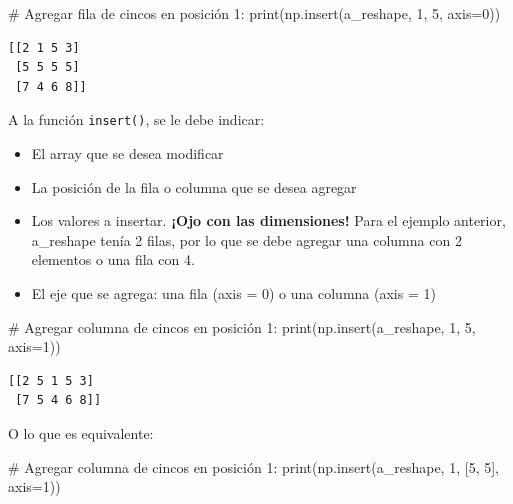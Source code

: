 \documentclass[
  letterpaper,
  DIV=11,
  numbers=noendperiod]{scrreprt}
\newenvironment{Shaded}{\begin{snugshade}}{\end{snugshade}}
\newcommand{\BuiltInTok}[1]{\textcolor[rgb]{0.00,0.23,0.31}{#1}}
\newcommand{\CommentTok}[1]{\textcolor[rgb]{0.37,0.37,0.37}{#1}}
\newcommand{\DecValTok}[1]{\textcolor[rgb]{0.68,0.00,0.00}{#1}}
\newcommand{\NormalTok}[1]{\textcolor[rgb]{0.00,0.23,0.31}{#1}}
\newcommand{\OperatorTok}[1]{\textcolor[rgb]{0.37,0.37,0.37}{#1}}
\providecommand{\tightlist}{%
  \setlength{\itemsep}{0pt}\setlength{\parskip}{0pt}}\usepackage{longtable,booktabs,array}
\begin{document}
\begin{Shaded}
\begin{Highlighting}[]
\CommentTok{\# Agregar fila de cincos en posición 1:}
\BuiltInTok{print}\NormalTok{(np.insert(a\_reshape, }\DecValTok{1}\NormalTok{, }\DecValTok{5}\NormalTok{, axis}\OperatorTok{=}\DecValTok{0}\NormalTok{))}
\end{Highlighting}
\end{Shaded}

\begin{verbatim}
[[2 1 5 3]
 [5 5 5 5]
 [7 4 6 8]]
\end{verbatim}

A la función \texttt{insert()}, se le debe indicar:\\

\begin{itemize}
\tightlist
\item
  El array que se desea modificar\\
\item
  La posición de la fila o columna que se desea agregar\\
\item
  Los valores a insertar. \textbf{¡Ojo con las dimensiones!} Para el
  ejemplo anterior, a\_reshape tenía 2 filas, por lo que se debe agregar
  una columna con 2 elementos o una fila con 4.\\
\item
  El eje que se agrega: una fila (axis = 0) o una columna (axis = 1)\\
\end{itemize}

\begin{Shaded}
\begin{Highlighting}[]
\CommentTok{\# Agregar columna de cincos en posición 1:}
\BuiltInTok{print}\NormalTok{(np.insert(a\_reshape, }\DecValTok{1}\NormalTok{, }\DecValTok{5}\NormalTok{, axis}\OperatorTok{=}\DecValTok{1}\NormalTok{))}
\end{Highlighting}
\end{Shaded}

\begin{verbatim}
[[2 5 1 5 3]
 [7 5 4 6 8]]
\end{verbatim}

O lo que es equivalente:

\begin{Shaded}
\begin{Highlighting}[]
\CommentTok{\# Agregar columna de cincos en posición 1:}
\BuiltInTok{print}\NormalTok{(np.insert(a\_reshape, }\DecValTok{1}\NormalTok{, [}\DecValTok{5}\NormalTok{, }\DecValTok{5}\NormalTok{], axis}\OperatorTok{=}\DecValTok{1}\NormalTok{))}
\end{Highlighting}
\end{Shaded}
\end{document}
